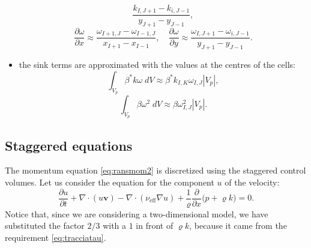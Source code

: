 \begin{itemize}
\begin{equation}
		\frac{k_{I,J+1}-k_{i,J-1}}{y_{J+1}-y_{J-1}},
	\end{equation}
	\begin{equation}
		\frac{\partial \omega}{\partial x} \approx \frac{\omega_{I+1,J} - 
		\omega_{I-1,J}}{x_{I+1} - x_{I-1}}, \quad \frac{\partial 
		\omega}{\partial y} \approx 
		\frac{\omega_{I,J+1}-\omega_{i,J-1}}{y_{J+1}-y_{J-1}}.
	\end{equation}
	\item the sink terms are approximated with the values at the centres of the 
	cells:
	\begin{equation}
		\int_{V_p} \beta^* k \omega \; dV \approx 
		\beta^*k_{I,K}\omega_{I,J}|V_p|,
	\end{equation}
	\begin{equation}
		\int_{V_p} \beta \omega^2 \; dV \approx \beta \omega_{I,J}^2 |V_p|.
	\end{equation}
\end{itemize}
%
\subsection{Staggered equations}
The momentum equation \eqref{eq:ransmom2} is discretized using the staggered 
control volumes. Let us consider the equation for the component $u$ of the 
velocity:
\begin{equation}
\frac{\partial u}{\partial t} + \nabla \cdot ( u \mathbf{v}) - \nabla \cdot 
(\nu_\text{eff} \nabla u) + \frac{1}{\varrho} \frac{\partial}{\partial x} 
\big(p 
+ \varrho k\big) = 0.
\end{equation}
Notice that, since we are considering a two-dimensional model, we have 
substituted the factor $2/3$ with a $1$ in front of $\varrho k$, because it 
came from the requirement \eqref{eq:tracciatau}.

